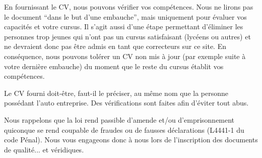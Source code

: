 ﻿En fournissant le CV, nous pouvons vérifier vos compétences.
Nous ne lirons pas le document “dans le but d’une embauche”, mais uniquement pour évaluer vos capacités et votre cursus. Il s’agit aussi d’une étape permettant d’éliminer les personnes trop jeunes qui n’ont pas un cursus satisfaisant (lycéens ou autres) et ne devraient donc pas être admis en tant que correcteurs sur ce site.
En conséquence, nous pouvons tolérer un CV non mis à jour (par exemple suite à votre dernière embauche) du moment que le reste du cursus établit vos compétences.

Le CV fourni doit-être, faut-il le préciser, au même nom que la personne possédant l’auto entreprise. Des vérifications sont faites afin d’éviter tout abus.

Nous rappelons que la loi rend passible d’amende et/ou d’emprisonnement quiconque se rend coupable de fraudes ou de fausses déclarations (L4441-1 du code Pénal). Nous vous engageons donc à nous lors de l’inscription des documents de qualité... et véridiques.